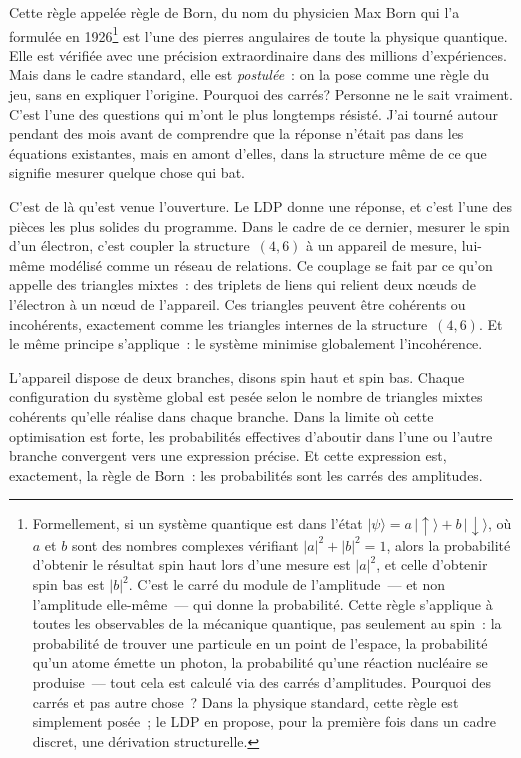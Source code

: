 \documentclass[12pt, a4paper, openright]{book}
\begin{document}
Cette règle appelée règle de Born, du nom du physicien Max Born qui l'a formulée en 1926\footnote{%
    Formellement, si un système quantique est dans l'état $|\psi\rangle = a\,|\!\uparrow\rangle + b\,|\!\downarrow\rangle$, où $a$ et $b$ sont des nombres complexes vérifiant $|a|^2 + |b|^2 = 1$, alors la probabilité d'obtenir le résultat \og spin haut\fg{} lors d'une mesure est $|a|^2$, et celle d'obtenir \og spin bas\fg{} est $|b|^2$. C'est le carré du module de l'amplitude~--- et non l'amplitude elle-même~--- qui donne la probabilité. Cette règle s'applique à toutes les observables de la mécanique quantique, pas seulement au spin~: la probabilité de trouver une particule en un point de l'espace, la probabilité qu'un atome émette un photon, la probabilité qu'une réaction nucléaire se produise~--- tout cela est calculé via des carrés d'amplitudes. Pourquoi des carrés et pas autre chose~? Dans la physique standard, cette règle est simplement posée~; le LDP en propose, pour la première fois dans un cadre discret, une dérivation structurelle.} 
est l'une des pierres angulaires de toute la physique quantique. Elle est vérifiée avec une précision extraordinaire dans des millions d'expériences. Mais dans le cadre standard, elle est \emph{postulée}~: on la pose comme une règle du jeu, sans en expliquer l'origine. Pourquoi des carrés? Personne ne le sait vraiment. C'est l'une des questions qui m'ont le plus longtemps résisté. J'ai tourné autour pendant des mois avant de comprendre que la réponse n'était pas dans les équations existantes, mais en amont d'elles, dans la structure même de ce que signifie mesurer quelque chose qui bat. 

\medskip

C'est de là qu'est venue l'ouverture. Le LDP donne une réponse, et c'est l'une des pièces les plus solides du programme. Dans le cadre de ce dernier, mesurer le spin d'un électron, c'est coupler la structure~$(4,6)$ à un appareil de mesure, lui-même modélisé comme un réseau de relations. Ce couplage se fait par ce qu'on appelle des triangles mixtes~: des triplets de liens qui relient deux nœuds de l'électron à un nœud de l'appareil. Ces triangles peuvent être cohérents ou incohérents, exactement comme les triangles internes de la structure~$(4,6)$. Et le même principe s'applique~: le système minimise globalement l'incohérence.

\medskip

L'appareil dispose de deux branches, disons \og spin haut\fg{} et \og spin bas\fg. Chaque configuration du système global est pesée selon le nombre de triangles mixtes cohérents qu'elle réalise dans chaque branche. Dans la limite où cette optimisation est forte, les probabilités effectives d'aboutir dans l'une ou l'autre branche convergent vers une expression précise. Et cette expression est, exactement, la règle de Born~: les probabilités sont les carrés des amplitudes.
\end{document}
